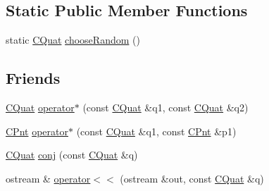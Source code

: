 \subsection*{Static Public Member Functions}
\begin{DoxyCompactItemize}
\item 
static \hyperlink{classCQuat}{C\-Quat} \hyperlink{classCQuat_a3788f9ce393c8c6e7dc2df6e7675c594}{choose\-Random} ()
\end{DoxyCompactItemize}
\subsection*{Friends}
\begin{DoxyCompactItemize}
\item 
\hyperlink{classCQuat}{C\-Quat} \hyperlink{classCQuat_a56293e53132060601a281240804d9302}{operator$\ast$} (const \hyperlink{classCQuat}{C\-Quat} \&q1, const \hyperlink{classCQuat}{C\-Quat} \&q2)
\item 
\hyperlink{classCPnt}{C\-Pnt} \hyperlink{classCQuat_ac98154ed89178004c9023423651b58a9}{operator$\ast$} (const \hyperlink{classCQuat}{C\-Quat} \&q1, const \hyperlink{classCPnt}{C\-Pnt} \&p1)
\item 
\hyperlink{classCQuat}{C\-Quat} \hyperlink{classCQuat_a751f3ac0c157ff6967eaf2673ce1527e}{conj} (const \hyperlink{classCQuat}{C\-Quat} \&q)
\item 
ostream \& \hyperlink{classCQuat_afeef42a3ba6ea600e39ee2accca10836}{operator$<$$<$} (ostream \&out, const \hyperlink{classCQuat}{C\-Quat} \&q)
\end{DoxyCompactItemize}


